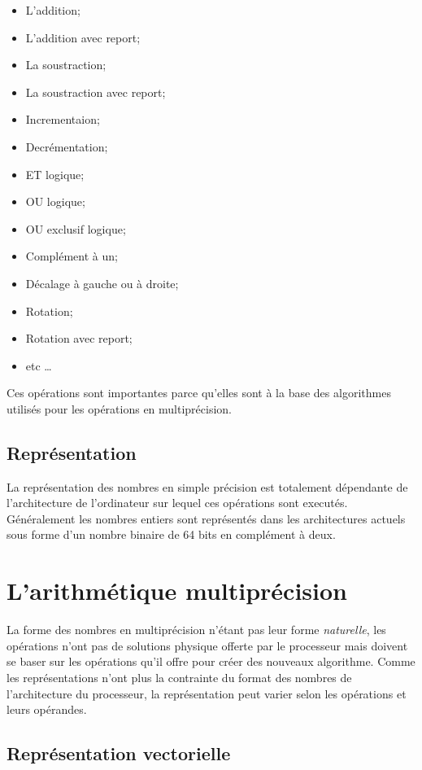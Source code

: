 \documentclass[letterpaper]{article}
\begin{document}
\begin{itemize}
  \item L'addition;
  \item L'addition avec report;
  \item La soustraction;
  \item La soustraction avec report;
  \item Incrementaion;
  \item Decrémentation;
  \item ET logique;
  \item OU logique;
  \item OU exclusif logique;
  \item Complément à un;
  \item Décalage à gauche ou à droite;
  \item Rotation;
  \item Rotation avec report;
  \item etc \dots
\end{itemize}

Ces opérations sont importantes parce qu'elles sont à la base des algorithmes
utilisés pour les opérations en multiprécision.

\subsection{Représentation}

La représentation des nombres en simple précision est totalement dépendante de
l'architecture de l'ordinateur sur lequel ces opérations sont executés.
Généralement les nombres entiers sont représentés dans les architectures
actuels sous forme d'un nombre binaire de 64 bits en complément à deux.

\section{L'arithmétique multiprécision}

La forme des nombres en multiprécision n'étant pas leur forme
\emph{naturelle}, les opérations n'ont pas de solutions physique offerte
par le processeur mais doivent se baser sur les opérations qu'il offre pour créer
des nouveaux algorithme. Comme les représentations n'ont plus la contrainte
du format des nombres de l'architecture du processeur, la représentation peut
varier selon les opérations et leurs opérandes.

\subsection{Représentation vectorielle}
\end{document}
